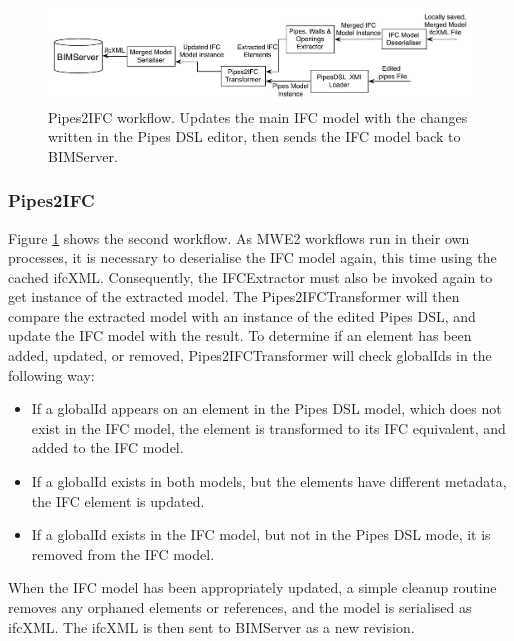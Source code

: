 \begin{figure}[t]
    \centering
        \includegraphics[width=120mm]{images/Pipes2IFC.pdf}
    \caption{Pipes2IFC workflow. Updates the main IFC model with the changes written in the Pipes DSL editor, then sends the IFC model back to BIMServer.}
    \label{fig:Pipes2IFCWorkflow}
\end{figure}
\subsubsection{Pipes2IFC}
Figure \ref{fig:Pipes2IFCWorkflow} shows the second workflow. As MWE2 workflows run in their own processes, it is necessary to deserialise the IFC model again, this time using the cached ifcXML. Consequently, the IFCExtractor must also be invoked again to get instance of the extracted model. The Pipes2IFCTransformer will then compare the extracted model with an instance of the edited Pipes DSL, and update the IFC model with the result. To determine if an element has been added, updated, or removed, Pipes2IFCTransformer will check globalIds in the following way:
\begin{itemize}
\item If a globalId appears on an element in the Pipes DSL model, which does not exist in the IFC model, the element is transformed to its IFC equivalent, and added to the IFC model.
\item If a globalId exists in both models, but the elements have different metadata, the IFC element is updated.
\item If a globalId exists in the IFC model, but not in the Pipes DSL mode, it is removed from the IFC model.
\end{itemize}
When the IFC model has been appropriately updated, a simple cleanup routine removes any orphaned elements or references, and the model is serialised as ifcXML. The ifcXML is then sent to BIMServer as a new revision.
